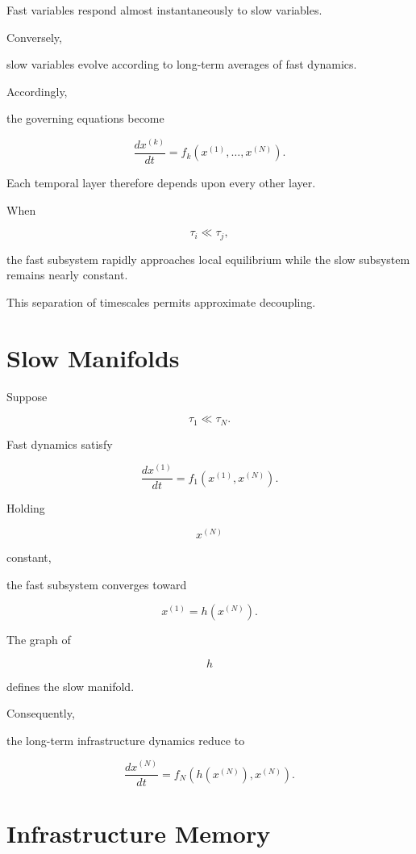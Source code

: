 \documentclass[11pt,fleqn]{book}
\numberwithin{equation}{chapter}
\theoremstyle{plain}
\theoremstyle{definition}
\theoremstyle{remark}
\begin{document}
Fast variables respond almost instantaneously to slow variables.

Conversely,

slow variables evolve according to long-term averages of fast dynamics.

Accordingly,

the governing equations become

\[
\frac{dx^{(k)}}{dt}
=
f_k
\left(
x^{(1)},
\ldots,
x^{(N)}
\right).
\]

Each temporal layer therefore depends upon every other layer.


When

\[
\tau_i
\ll
\tau_j,
\]

the fast subsystem rapidly approaches local equilibrium while the slow
subsystem remains nearly constant.

This separation of timescales permits approximate decoupling.


\section{Slow Manifolds}

Suppose

\[
\tau_1
\ll
\tau_N.
\]

Fast dynamics satisfy

\[
\frac{dx^{(1)}}{dt}
=
f_1(x^{(1)},x^{(N)}).
\]

Holding

\[
x^{(N)}
\]

constant,

the fast subsystem converges toward

\[
x^{(1)}
=
h(x^{(N)}).
\]

The graph of

\[
h
\]

defines the slow manifold.

Consequently,

the long-term infrastructure dynamics reduce to

\[
\boxed{
\frac{dx^{(N)}}{dt}
=
f_N
\left(
h(x^{(N)}),
x^{(N)}
\right).
}
\]


\section{Infrastructure Memory}
\end{document}
